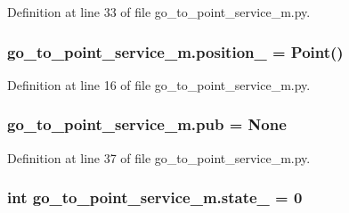 Definition at line 33 of file go\+\_\+to\+\_\+point\+\_\+service\+\_\+m.\+py.

\subsubsection[{\texorpdfstring{position\+\_\+}{position_}}]{\setlength{\rightskip}{0pt plus 5cm}go\+\_\+to\+\_\+point\+\_\+service\+\_\+m.\+position\+\_\+ = Point()}\hypertarget{namespacego__to__point__service__m_abb95705acc8e0b8a82a6fc5d6243bdd8}{}\label{namespacego__to__point__service__m_abb95705acc8e0b8a82a6fc5d6243bdd8}


Definition at line 16 of file go\+\_\+to\+\_\+point\+\_\+service\+\_\+m.\+py.

\subsubsection[{\texorpdfstring{pub}{pub}}]{\setlength{\rightskip}{0pt plus 5cm}go\+\_\+to\+\_\+point\+\_\+service\+\_\+m.\+pub = None}\hypertarget{namespacego__to__point__service__m_ab9ea0cd28ffda51b5d6f1a436464f861}{}\label{namespacego__to__point__service__m_ab9ea0cd28ffda51b5d6f1a436464f861}


Definition at line 37 of file go\+\_\+to\+\_\+point\+\_\+service\+\_\+m.\+py.

\subsubsection[{\texorpdfstring{state\+\_\+}{state_}}]{\setlength{\rightskip}{0pt plus 5cm}int go\+\_\+to\+\_\+point\+\_\+service\+\_\+m.\+state\+\_\+ = 0}\hypertarget{namespacego__to__point__service__m_a840bab237e425d4f242bf69afe92f767}{}\label{namespacego__to__point__service__m_a840bab237e425d4f242bf69afe92f767}


